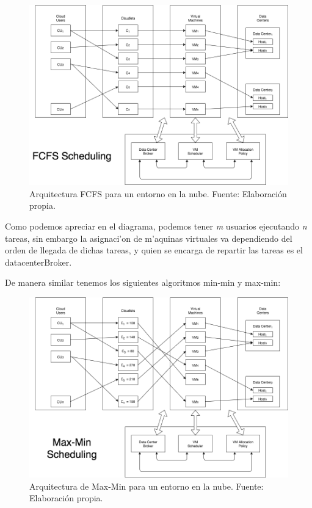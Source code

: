 \begin{figure}
	\caption{Arquitectura FCFS para un entorno en la nube. Fuente: Elaboración propia.}
	\centering
	\includegraphics[scale=0.5]{media/imagentres}
\end{figure}



Como podemos apreciar en el diagrama, podemos tener \emph{m} usuarios ejecutando \emph{n} tareas, sin embargo la asignaci'on de m'aquinas virtuales va dependiendo del orden de llegada de dichas tareas, y quien se encarga de repartir las tareas es el datacenterBroker.

De manera similar tenemos los siguientes algoritmos min-min y max-min:



\begin{figure}
	\caption{Arquitectura de Max-Min para un entorno en la nube. Fuente: Elaboración propia.}
	\centering
	\includegraphics[scale=0.5]{media/imagencuatro}
\end{figure}


